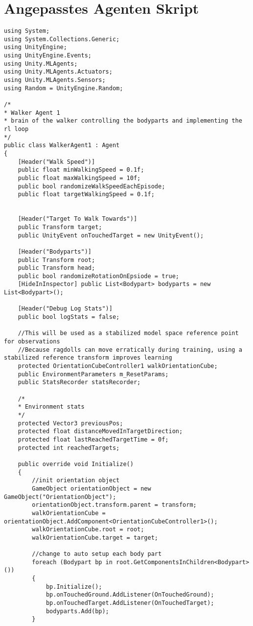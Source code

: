 \section{Angepasstes Agenten Skript}
\begin{lstlisting}[caption={Agenten Skript},captionpos=b,label={lst:skript_agent1}]
using System;
using System.Collections.Generic;
using UnityEngine;
using UnityEngine.Events;
using Unity.MLAgents;
using Unity.MLAgents.Actuators;
using Unity.MLAgents.Sensors;
using Random = UnityEngine.Random;

/*
* Walker Agent 1
* brain of the walker controlling the bodyparts and implementing the rl loop
*/
public class WalkerAgent1 : Agent
{
    [Header("Walk Speed")]
    public float minWalkingSpeed = 0.1f;
    public float maxWalkingSpeed = 10f;
    public bool randomizeWalkSpeedEachEpisode;
    public float targetWalkingSpeed = 0.1f;


    [Header("Target To Walk Towards")]
    public Transform target;
    public UnityEvent onTouchedTarget = new UnityEvent();

    [Header("Bodyparts")]
    public Transform root;
    public Transform head;
    public bool randomizeRotationOnEpsiode = true;
    [HideInInspector] public List<Bodypart> bodyparts = new List<Bodypart>();

    [Header("Debug Log Stats")]
    public bool logStats = false;

    //This will be used as a stabilized model space reference point for observations
    //Because ragdolls can move erratically during training, using a stabilized reference transform improves learning
    protected OrientationCubeController1 walkOrientationCube;
    public EnvironmentParameters m_ResetParams;
    public StatsRecorder statsRecorder;

    /*
    * Environment stats
    */
    protected Vector3 previousPos;
    protected float distanceMovedInTargetDirection;
    protected float lastReachedTargetTime = 0f;
    protected int reachedTargets;

    public override void Initialize()
    {
        //init orientation object
        GameObject orientationObject = new GameObject("OrientationObject");
        orientationObject.transform.parent = transform;
        walkOrientationCube = orientationObject.AddComponent<OrientationCubeController1>();
        walkOrientationCube.root = root;
        walkOrientationCube.target = target;

        //change to auto setup each body part
        foreach (Bodypart bp in root.GetComponentsInChildren<Bodypart>())
        {
            bp.Initialize();
            bp.onTouchedGround.AddListener(OnTouchedGround);
            bp.onTouchedTarget.AddListener(OnTouchedTarget);
            bodyparts.Add(bp);
        }


\end{lstlisting}
